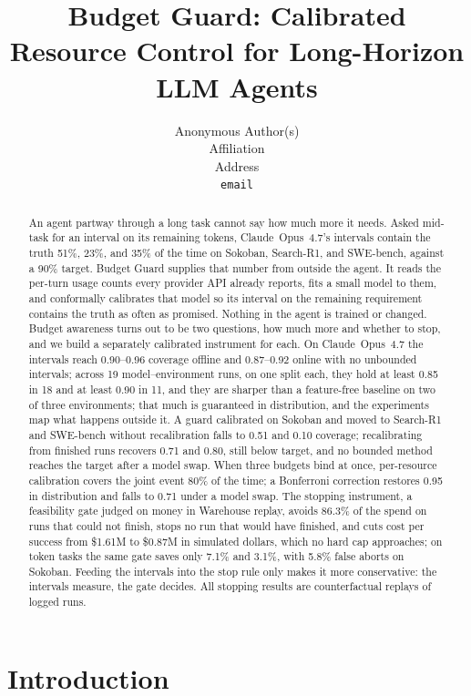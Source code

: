 \documentclass{article}
\title{Budget Guard: Calibrated Resource Control for Long-Horizon LLM Agents}
\author{
  Anonymous Author(s)\\
  Affiliation\\
  Address\\
  \texttt{email}
}
\begin{document}
\maketitle

\begin{abstract}
An agent partway through a long task cannot say how much more it needs. Asked mid-task for an interval on its remaining tokens, Claude~Opus~4.7's intervals contain the truth 51\%, 23\%, and 35\% of the time on Sokoban, Search-R1, and SWE-bench, against a 90\% target. Budget Guard supplies that number from outside the agent. It reads the per-turn usage counts every provider API already reports, fits a small model to them, and conformally calibrates that model so its interval on the remaining requirement contains the truth as often as promised. Nothing in the agent is trained or changed. Budget awareness turns out to be two questions, how much more and whether to stop, and we build a separately calibrated instrument for each. On Claude~Opus~4.7 the intervals reach 0.90--0.96 coverage offline and 0.87--0.92 online with no unbounded intervals; across 19 model--environment runs, on one split each, they hold at least 0.85 in 18 and at least 0.90 in 11, and they are sharper than a feature-free baseline on two of three environments; that much is guaranteed in distribution, and the experiments map what happens outside it. A guard calibrated on Sokoban and moved to Search-R1 and SWE-bench without recalibration falls to 0.51 and 0.10 coverage; recalibrating from finished runs recovers 0.71 and 0.80, still below target, and no bounded method reaches the target after a model swap. When three budgets bind at once, per-resource calibration covers the joint event 80\% of the time; a Bonferroni correction restores 0.95 in distribution and falls to 0.71 under a model swap. The stopping instrument, a feasibility gate judged on money in Warehouse replay, avoids 86.3\% of the spend on runs that could not finish, stops no run that would have finished, and cuts cost per success from \$1.61M to \$0.87M in simulated dollars, which no hard cap approaches; on token tasks the same gate saves only 7.1\% and 3.1\%, with 5.8\% false aborts on Sokoban. Feeding the intervals into the stop rule only makes it more conservative: the intervals measure, the gate decides. All stopping results are counterfactual replays of logged runs.
\end{abstract}

\raggedbottom
\section{Introduction}
\label{sec:intro}
\end{document}
